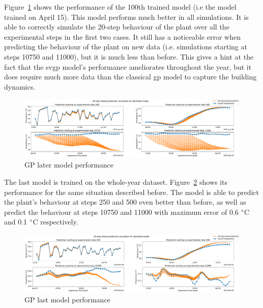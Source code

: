 \clearpage

Figure~\ref{fig:SVGP_later_model_performance} shows the performance of the 100th
trained model (i.e the model trained on April 15). This model performs much
better in all simulations. It is able to correctly simulate the 20-step
behaviour of the plant over all the experimental steps in the first two cases.
It still has a noticeable error when predicting the behaviour of the plant on
new data (i.e. simulations starting at steps 10750 and 11000), but it is much
less than before. This gives a hint at the fact that the \acrshort{svgp} model's
performance ameliorates throughout the year, but it does require much more data
than the classical \acrshort{gp} model to capture the building dynamics.

\begin{figure}[ht]
    \centering
    \includegraphics[width =
    \textwidth]{Plots/1_SVGP_480pts_inf_window_12_averageYear_later_model_performance.pdf}
    \caption{GP later model performance}
    \label{fig:SVGP_later_model_performance}
\end{figure}

The last model is trained on the whole-year dataset.
Figure~\ref{fig:SVGP_last_model_performance} shows its performance for the same
situation described before. The model is able to predict the plant's behaviour
at steps 250 and 500 even better than before, as well as predict the behaviour
at steps 10750 and 11000 with maximum error of 0.6 $\degree$C and 0.1 $\degree$C
respectively.

\begin{figure}[ht]
    \centering
    \includegraphics[width =
    \textwidth]{Plots/1_SVGP_480pts_inf_window_12_averageYear_last_model_performance.pdf}
    \caption{GP last model performance}
    \label{fig:SVGP_last_model_performance}
\end{figure}

